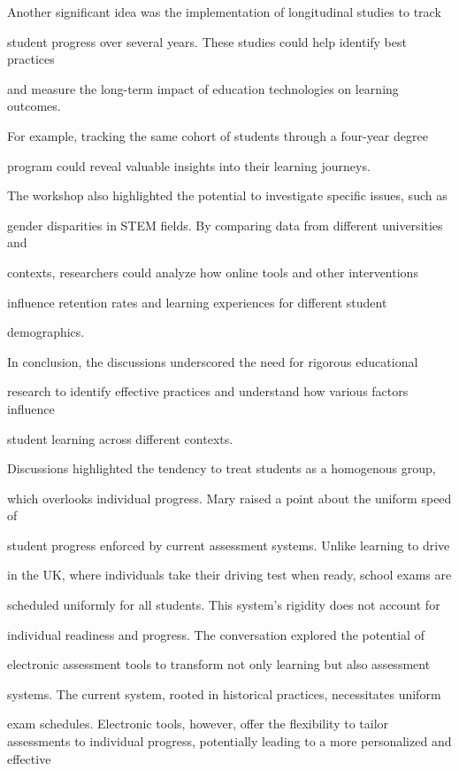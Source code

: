 \documentclass[11pt]{article}
\begin{document}
Another significant idea was the implementation of longitudinal studies to track

student progress over several years. These studies could help identify best practices

and measure the long-term impact of education technologies on learning outcomes.

For example, tracking the same cohort of students through a four-year degree

program could reveal valuable insights into their learning journeys.

The workshop also highlighted the potential to investigate specific issues, such as

gender disparities in STEM fields. By comparing data from different universities and

contexts, researchers could analyze how online tools and other interventions

influence retention rates and learning experiences for different student

demographics.

In conclusion, the discussions underscored the need for rigorous educational

research to identify effective practices and understand how various factors influence

student learning across different contexts.

Discussions highlighted the tendency to treat students as a homogenous group,

which overlooks individual progress. Mary raised a point about the uniform speed of

student progress enforced by current assessment systems. Unlike learning to drive

in the UK, where individuals take their driving test when ready, school exams are

scheduled uniformly for all students. This system's rigidity does not account for

individual readiness and progress. The conversation explored the potential of

electronic assessment tools to transform not only learning but also assessment

systems. The current system, rooted in historical practices, necessitates uniform

exam schedules. Electronic tools, however, offer the flexibility to tailor assessments to individual progress, potentially leading to a more personalized and effective
\end{document}
